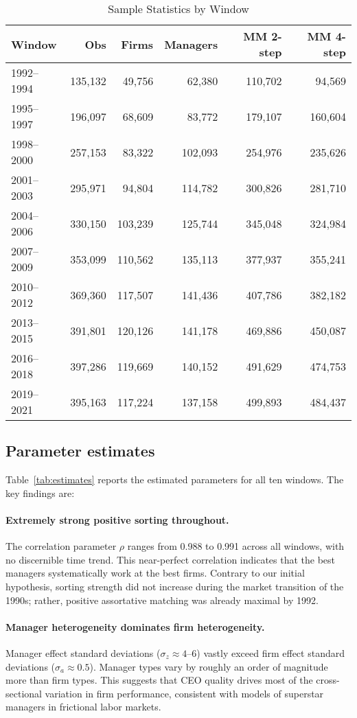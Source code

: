 \documentclass[11pt]{article}
\begin{document}
\begin{table}[t]
\centering
\caption{Sample Statistics by Window}
\label{tab:sample-stats}
\begin{tabular}{lrrrrr}
\toprule
Window & Obs & Firms & Managers & MM 2-step & MM 4-step \\
\midrule
1992--1994 & 135,132 & 49,756 & 62,380 & 110,702 & 94,569 \\
1995--1997 & 196,097 & 68,609 & 83,772 & 179,107 & 160,604 \\
1998--2000 & 257,153 & 83,322 & 102,093 & 254,976 & 235,626 \\
2001--2003 & 295,971 & 94,804 & 114,782 & 300,826 & 281,710 \\
2004--2006 & 330,150 & 103,239 & 125,744 & 345,048 & 324,984 \\
2007--2009 & 353,099 & 110,562 & 135,113 & 377,937 & 355,241 \\
2010--2012 & 369,360 & 117,507 & 141,436 & 407,786 & 382,182 \\
2013--2015 & 391,801 & 120,126 & 141,178 & 469,886 & 450,087 \\
2016--2018 & 397,286 & 119,669 & 140,152 & 491,629 & 474,753 \\
2019--2021 & 395,163 & 117,224 & 137,158 & 499,893 & 484,437 \\
\bottomrule
\end{tabular}
\end{table}

\subsection{Parameter estimates}
Table~\ref{tab:estimates} reports the estimated parameters for all ten windows. The key findings are:

\paragraph{Extremely strong positive sorting throughout.} The correlation parameter $\rho$ ranges from 0.988 to 0.991 across all windows, with no discernible time trend. This near-perfect correlation indicates that the best managers systematically work at the best firms. Contrary to our initial hypothesis, sorting strength did not increase during the market transition of the 1990s; rather, positive assortative matching was already maximal by 1992.

\paragraph{Manager heterogeneity dominates firm heterogeneity.} Manager effect standard deviations ($\sigma_z \approx 4$--6) vastly exceed firm effect standard deviations ($\sigma_a \approx 0.5$). Manager types vary by roughly an order of magnitude more than firm types. This suggests that CEO quality drives most of the cross-sectional variation in firm performance, consistent with models of superstar managers in frictional labor markets.
\end{document}
